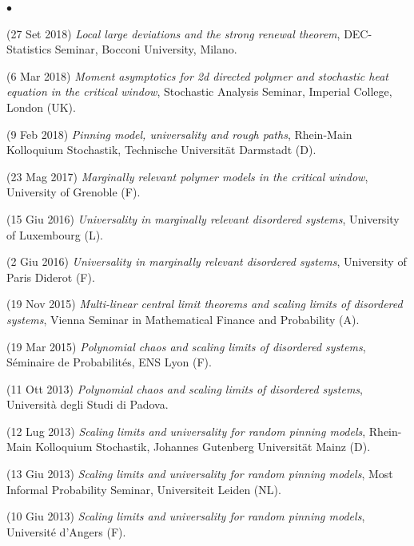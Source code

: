 \documentclass[a4paper,11pt,oneside]{amsart}
\newenvironment{myitemize}{%
\begin{list}{$\bullet$}%
 	{%
	\setlength{\itemsep}{0.3em}%
	\setlength{\topsep}{0.3em}%
	\setlength{\partopsep}{0em}%
	\setlength{\parsep}{0em}%
	\setlength{\parskip}{0em}%
	\setlength\leftmargin{1.5em}%
	\setlength\labelwidth{1.1em}%
	\setlength{\labelsep}{0.4em}%
	}%
	}%
{\end{list}}
\renewenvironment{itemize}{
\begin{myitemize}}%
{\end{myitemize}}
\begin{document}
\begin{itemize}
\item (27 Set 2018)
\emph{Local large deviations and the strong renewal theorem},
DEC-Statistics Seminar, Bocconi University, Milano.

\item (6 Mar 2018)
\emph{Moment asymptotics for 2d directed polymer and stochastic 
heat equation in the critical window},
Stochastic Analysis Seminar, Imperial College, London (UK).

\item (9 Feb 2018)
\emph{Pinning model, universality and rough paths},
Rhein-Main Kolloquium Stochastik, Technische Universit\"at Darmstadt (D).

\item (23 Mag 2017)
\emph{Marginally relevant polymer models in the critical window},
University of Grenoble (F).

\item (15 Giu 2016)
\emph{Universality in marginally relevant disordered systems},
University of Luxembourg (L).

\item (2 Giu 2016)
\emph{Universality in marginally relevant disordered systems},
University of Paris Diderot (F).

\item (19 Nov 2015)
\emph{Multi-linear central limit theorems and scaling limits of disordered systems},
Vienna Seminar in Mathematical Finance and Probability (A).

\item (19 Mar 2015)
\emph{Polynomial chaos and scaling limits of disordered systems},
Séminaire de Probabilités, ENS Lyon (F).

\item (11 Ott 2013)
\emph{Polynomial chaos and scaling limits of disordered systems},
Università degli Studi di Padova.

\item (12 Lug 2013)
\emph{Scaling limits and universality for random pinning models},
Rhein-Main Kolloquium Stochastik, Johannes Gutenberg Universit\"at Mainz (D).

\item (13 Giu 2013)
\emph{Scaling limits and universality for random pinning models},
Most Informal Probability Seminar, Universiteit Leiden (NL).

\item (10 Giu 2013)
\emph{Scaling limits and universality for random pinning models},
Université d'Angers (F).


\end{itemize}
\end{document}
